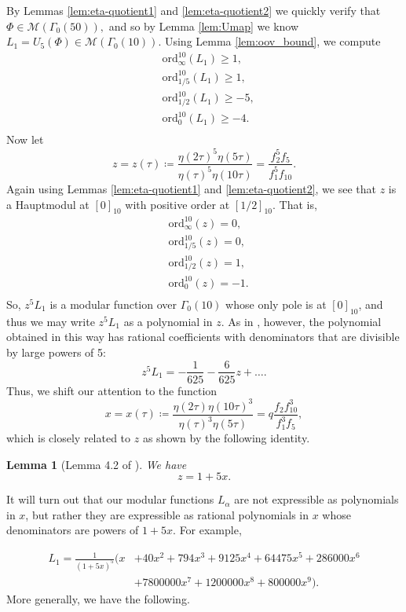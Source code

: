 \documentclass[12pt, reqno]{amsart}
\newtheorem{lem}[thm]{Lemma}
\theoremstyle{definition}
\theoremstyle{remark}
\begin{document}
By Lemmas \ref{lem:eta-quotient1} and \ref{lem:eta-quotient2} we quickly verify that $\Phi \in \mathcal{M}(\Gamma_0(50)),$ and so by Lemma \ref{lem:Umap} we know $L_1 = U_5(\Phi) \in \mathcal{M}(\Gamma_0(10)).$ Using Lemma \ref{lem:oov_bound}, we compute
\begin{align*}
&\text{ord}_\infty^{10}(L_1) \geq 1,\\
&\text{ord}_{1/5}^{10}(L_1) \geq 1,\\
&\text{ord}_{1/2}^{10}(L_1) \geq -5,\\
&\text{ord}_0^{10}(L_1) \geq -4.\\
\end{align*}
Now let 
\[z = z(\tau) \coloneqq \frac{\eta(2\tau)^5\eta(5\tau)}{\eta(\tau)^5\eta(10\tau)} = \frac{f_2^5 f_5}{f_1^5f_{10}}.\]
Again using Lemmas \ref{lem:eta-quotient1} and \ref{lem:eta-quotient2}, we see that $z$ is a Hauptmodul at $[0]_{10}$ with positive order at $[1/2]_{10}.$ That is,
\begin{align*}
&\text{ord}_\infty^{10}(z) = 0,\\
&\text{ord}_{1/5}^{10}(z) = 0,\\
&\text{ord}_{1/2}^{10}(z) = 1,\\
&\text{ord}_0^{10}(z) = -1.\\
\end{align*}
So, $z^5 L_1$ is a modular function over $\Gamma_0(10)$ whose only pole is at $[0]_{10}$, and thus we may write $z^5L_1$ as a polynomial in $z$. As in \cite{BS}, however, the polynomial obtained in this way has rational coefficients with denominators that are divisible by large powers of 5:
\[z^5L_1 = -\frac{1}{625} - \frac{6}{625} z + \dots.\]
Thus, we shift our attention to the function 
\[x = x(\tau) \coloneqq \frac{\eta(2\tau)\eta(10\tau)^3}{\eta(\tau)^3\eta(5\tau)} = q \frac{f_2f_{10}^3}{f_1^3f_5},\]
which is closely related to $z$ as shown by the following identity. 

\begin{lem}[Lemma 4.2 of \cite{BS}]
We have 
\[z = 1+5x.\]
\end{lem}

It will turn out that our modular functions $L_\alpha$ are not expressible as polynomials in $x$, but rather they are expressible as rational polynomials in $x$ whose denominators are powers of $1+5x$. For example,

\begin{equation}\label{eq:L1}
\begin{split}
L_1 = \frac{1}{(1+5x)^5} (x&+40x^2+794x^3+9125x^4+64475x^5+286000x^6\\
&+7800000x^7+1200000x^8+800000x^9).
\end{split}
\end{equation}
More generally, we have the following.
\end{document}
